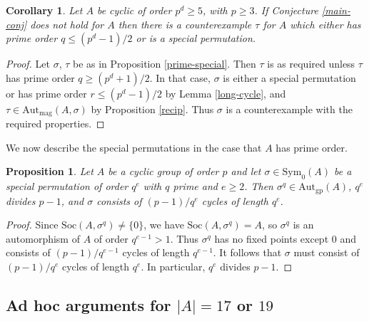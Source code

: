 \documentclass[letterpaper,12pt]{amsart}
\numberwithin{equation}{section}
\numberwithin{algorithm}{section}
\newtheorem{proposition}[lemma]{Proposition}
\newtheorem{corollary}[lemma]{Corollary}
\theoremstyle{definition}
\newcommand{\Soc}{\mathrm{Soc}}
\newcommand{\Autgp}{\mathrm{Aut}_{\mathrm{gp}}}
\newcommand{\Autmag}{\mathrm{Aut}_\mathrm{mag}}
\newcommand{\Symo}{\mathrm{Sym}_0}
\begin{document}
\begin{corollary} \label{special_or_smallprime}
Let $A$ be cyclic of order $p^d \geq 5$, with $p \geq 3$. If Conjecture \ref{main-conj} does not hold for $A$ then there is a counterexample $\tau$ for $A$ which either has prime order $q \leq (p^d-1)/2$ or is a special permutation. 	
\end{corollary}
 \begin{proof}
 Let $\sigma$, $\tau$ be as in Proposition \ref{prime-special}. Then $\tau$ is as required unless $\tau$ has prime order $q \geq (p^d+1)/2$. In that case, $\sigma$ is either a special permutation or has prime order $r \leq (p^d-1)/2$ by Lemma \ref{long-cycle}, and $\tau \in \Autmag(A,\sigma)$ by Proposition \ref{recip}. Thus $\sigma$ is a counterexample with the required properties.	
 \end{proof}
 
 We now describe the special permutations in the case that $A$ has prime order.
 
 \begin{proposition} \label{special-p}
 Let $A$ be a cyclic group of order $p$ and let $\sigma \in \Symo(A)$ be a special permutation of order $q^e$ with $q$ prime and $e \geq 2$. Then $\sigma^q \in \Autgp(A)$, $q^e$ divides $p-1$, and $\sigma$ consists of $(p-1)/q^e$ cycles of length $q^e$.
 \end{proposition}
 \begin{proof}
 Since $\Soc(A,\sigma^q) \neq \{0\}$, we have $\Soc(A,\sigma^q)=A$, so $\sigma^q$ is an automorphism of $A$ of order $q^{e-1}>1$. Thus $\sigma^q$ has no fixed points except $0$ and consists of $(p-1)/q^{e-1}$ cycles of length $q^{e-1}$. It follows that $\sigma$ must consist of $(p-1)/q^e$ cycles of length $q^e$. In particular, $q^e$ divides $p-1$. 
 \end{proof}
 

\subsection{Ad hoc arguments for $|A|=17$ or $19$}
\end{document}
